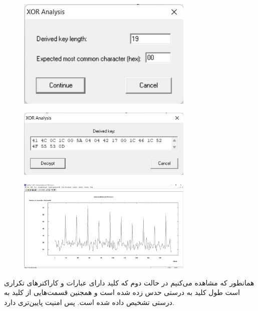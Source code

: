 \documentclass{article}
\begin{document}
\begin{figure}[H]
    \centering
    \includegraphics[width=0.75\textwidth]{figures/5c4.jpg}
    \caption
	{}
    \label{fig:fig1}
\end{figure}
\begin{figure}[H]
    \centering
    \includegraphics[width=0.75\textwidth]{figures/5c5.jpg}
    \caption
	{}
    \label{fig:fig1}
\end{figure}
\begin{figure}[H]
    \centering
    \includegraphics[width=0.75\textwidth]{figures/5c6.jpg}
    \caption
	{}
    \label{fig:fig1}
\end{figure}



همانطور که مشاهده می‌کنیم در حالت دوم که کلید دارای عبارات و کاراکترهای تکراری است طول کلید به درستی حدس زده شده است و همجنین قسمت‌هایی از کلید به درستی تشخیص داده شده است. پس امنیت پایین‌تری دارد.
\end{document}
